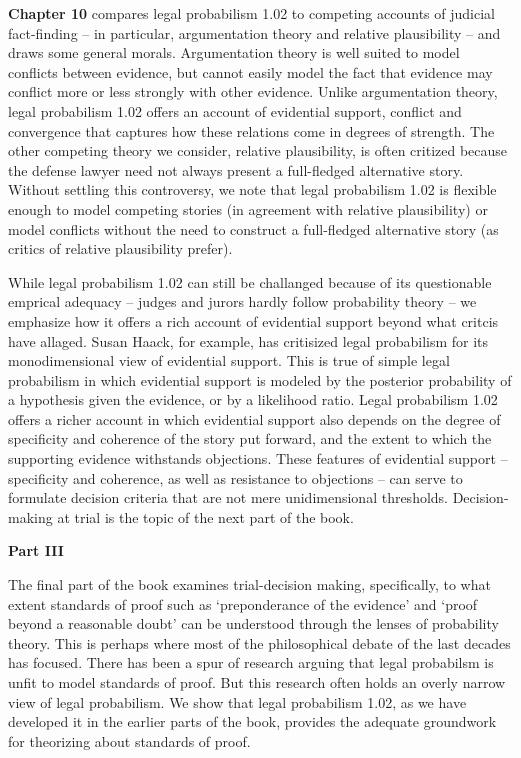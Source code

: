 \documentclass[10pt,dvipsnames,enabledeprecatedfontcommands]{scrartcl}
\begin{document}
\textbf{Chapter 10} compares legal probabilism 1.02 to competing
accounts of judicial fact-finding -- in particular, argumentation theory
and relative plausibility -- and draws some general morals.
Argumentation theory is well suited to model conflicts between evidence,
but cannot easily model the fact that evidence may conflict more or less
strongly with other evidence. Unlike argumentation theory, legal
probabilism 1.02 offers an account of evidential support, conflict and
convergence that captures how these relations come in degrees of
strength. The other competing theory we consider, relative plausibility,
is often critized because the defense lawyer need not always present a
full-fledged alternative story. Without settling this controversy, we
note that legal probabilism 1.02 is flexible enough to model competing
stories (in agreement with relative plausibility) or model conflicts
without the need to construct a full-fledged alternative story (as
critics of relative plausibility prefer).

While legal probabilism 1.02 can still be challanged because of its
questionable emprical adequacy -- judges and jurors hardly follow
probability theory -- we emphasize how it offers a rich account of
evidential support beyond what critcis have allaged. Susan Haack, for
example, has critisized legal probabilism for its monodimensional view
of evidential support. This is true of simple legal probabilism in which
evidential support is modeled by the posterior probability of a
hypothesis given the evidence, or by a likelihood ratio. Legal
probabilism 1.02 offers a richer account in which evidential support
also depends on the degree of specificity and coherence of the story put
forward, and the extent to which the supporting evidence withstands
objections. These features of evidential support -- specificity and
coherence, as well as resistance to objections -- can serve to formulate
decision criteria that are not mere unidimensional thresholds.
Decision-making at trial is the topic of the next part of the book.

\vspace{3mm}

\noindent \textbf{Part III}

The final part of the book examines trial-decision making, specifically,
to what extent standards of proof such as `preponderance of the
evidence' and `proof beyond a reasonable doubt' can be understood
through the lenses of probability theory. This is perhaps where most of
the philosophical debate of the last decades has focused. There has been
a spur of research arguing that legal probabilsm is unfit to model
standards of proof. But this research often holds an overly narrow view
of legal probabilism. We show that legal probabilism 1.02, as we have
developed it in the earlier parts of the book, provides the adequate
groundwork for theorizing about standards of proof.
\end{document}
